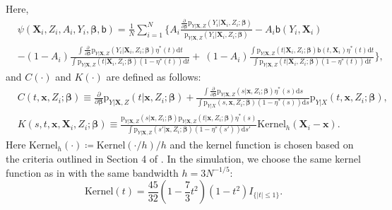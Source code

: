 \documentclass{article}
\def\sfb{\mathsf{b}}
\def\sfb{\mathsf{b}}
\def\bfX{\mathbf{X}}
\def\bfx{\mathbf{x}}
\theoremstyle{plain}
\theoremstyle{definition}
\theoremstyle{remark}
\def\diff{\mathrm{d}}
\def\bbeta{\boldsymbol{\beta}}
\def\p{\mathrm{p}}
\begin{document}
Here,
\begin{equation*}
\begin{aligned}
& \psi(\bfX_{i},Z_i, A_i, Y_i, \boldsymbol{\beta}, \sfb)  = \frac{1}{N} \sum_{i = 1}^{N} \Bigg\{ 
 A_i \frac{\frac{\partial}{\partial \bbeta} \p_{Y | \bfX, Z} (Y_i | \bfX_{i},Z_i; \bbeta)}{\p_{Y | \bfX, Z} (Y_i | \bfX_{i},Z_i; \bbeta)} - A_{i} \sfb (Y_{i},\bfX_{i}) \\ 
& - (1-A_i)\frac{\int \frac{\partial}{\partial \bbeta} \p_{Y | \bfX, Z} (Y_i | \bfX_{i},Z_i; \bbeta) \eta^{\ast} (t) \diff t}{\int \p_{Y | \bfX, Z} (t | \bfX_{i},Z_i; \bbeta) (1 - \eta^{\ast} (t)) \diff t}  +  \ (1 - A_{i}) \frac{\int \p_{Y | \bfX, Z} (t | \bfX_{i},Z_i; \bbeta) \sfb (t,\bfX_{i}) \eta^{\ast} (t) \diff t}{\int \p_{Y | \bfX, Z} (t | \bfX_{i}, Z_i; \bbeta) (1 - \eta^{\ast} (t)) \diff t} \Bigg\},
\end{aligned}
\end{equation*}
and $C(\cdot)$ and $K(\cdot)$ are defined as follows:
\begin{equation*}
\label{app:key_2}
\begin{split}
& C (t,\bfx,Z_i; \bbeta) \equiv \frac{\partial}{\partial \bbeta} \p_{Y | \bfX, Z} (t | \bfx,Z_i; \bbeta)  + \frac {\int \frac{\partial}{\partial \bbeta} \p_{Y | \bfX, Z} (s | \bfx,Z_i; \bbeta) \eta^{\ast} (s) \diff s} {\int \p_{Y | X} (s,\bfx,Z_i; \bbeta) (1 - \eta^{\ast} (s)) \diff s} \p_{Y | X} (t,\bfx,Z_i; \bbeta),\\
& K (s,t,\bfx,\bfX_i, Z_i; \bbeta) \equiv \frac{\p_{Y | \bfX, Z} (s | \bfx,Z_i; \bbeta) \p_{Y | \bfX, Z} (t | \bfx,Z_i; \bbeta) \eta^{\ast} (s)}{\int \p_{Y | \bfX, Z} (s' | \bfx,Z_i; \bbeta) (1 - \eta^{\ast} (s')) \diff s'} \text{Kernel}_{h} (\bfX_i-\bfx).
\end{split}
\end{equation*}
Here $\text{Kernel}_{h} (\cdot) \coloneqq \text{Kernel} (\cdot / h) / h$ and the kernel function is chosen based on the criteria outlined in Section 4 of \citet{zhao2022versatile}. In the simulation, we choose the same kernel function as in \citet{zhao2022versatile} with the same bandwidth $h = 3 N^{-1/5}$:
\begin{equation*}
\text{Kernel} (t)=\frac{45}{32}\left(1-\frac{7}{3} t^2\right)\left(1-t^2\right) I_{\{|t| \leq 1\}}.
\end{equation*}

\end{document}
